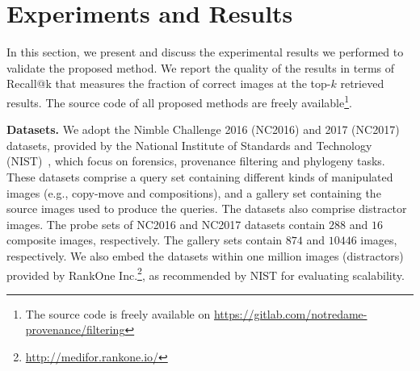 \section{Experiments and Results}
\label{sec:experiments}
In this section, we present and discuss the experimental results we performed to validate the proposed method. We report the quality of the results in terms of Recall@k that measures the fraction of correct images at the top-$k$ retrieved results. The source code of all proposed methods are freely available\footnote{The source code is freely available on \url{https://gitlab.com/notredame-provenance/filtering}}.

\vspace*{0.1cm}
\noindent
\textbf{Datasets.} 
We adopt the Nimble Challenge 2016 (NC2016) and 2017 (NC2017) datasets, provided by the National Institute of Standards and Technology (NIST)~\cite{Nimble_2016}, which focus on forensics, provenance filtering and phylogeny tasks. These datasets comprise a query set containing different kinds of manipulated images (e.g., copy-move and compositions), and a gallery set containing the source images used to produce the queries. The datasets also comprise distractor images. The probe sets of NC2016 and NC2017 datasets contain $288$ and $16$ composite images, respectively. The gallery sets contain $874$ and $10446$ images, respectively. We also embed the datasets within one million images (distractors) provided by RankOne Inc.\footnote{\url{http://medifor.rankone.io/}}, as recommended by NIST for evaluating scalability. 

